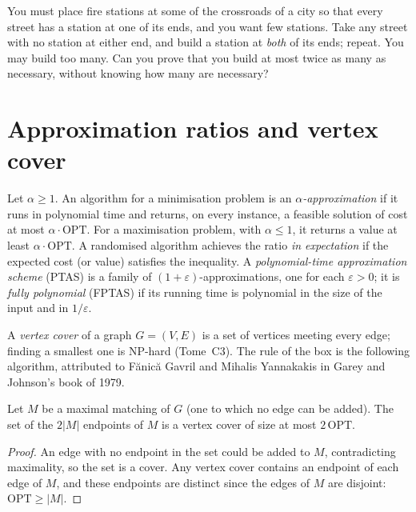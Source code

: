 \begin{think}
You must place fire stations at some of the crossroads of a city so that every street has a station at one of its ends, and you want few stations. Take any street with no station at either end, and build a station at \emph{both} of its ends; repeat. You may build too many. Can you prove that you build at most twice as many as necessary, without knowing how many are necessary?
\end{think}

\section{Approximation ratios and vertex cover}\label{sec:vc}

\begin{definition}
Let $\alpha\ge1$. An algorithm for a minimisation problem is an \emph{$\alpha$-approximation} if it runs in polynomial time and returns, on every instance, a feasible solution of cost at most $\alpha\cdot\mathrm{OPT}$. For a maximisation problem, with $\alpha\le1$, it returns a value at least $\alpha\cdot\mathrm{OPT}$. A randomised algorithm achieves the ratio \emph{in expectation} if the expected cost (or value) satisfies the inequality.
A \emph{polynomial-time approximation scheme} (PTAS) is a family of $(1+\varepsilon)$-approximations, one for each $\varepsilon>0$; it is \emph{fully polynomial} (FPTAS) if its running time is polynomial in the size of the input and in $1/\varepsilon$.
\end{definition}

A \emph{vertex cover} of a graph $G=(V,E)$ is a set of vertices meeting every edge; finding a smallest one is NP-hard (Tome~C3). The rule of the box is the following algorithm, attributed to Fănică Gavril and Mihalis Yannakakis in Garey and Johnson's book of 1979.

\begin{proposition}\label{prop:vcmatching}
Let $M$ be a maximal matching of $G$ (one to which no edge can be added). The set of the $2|M|$ endpoints of $M$ is a vertex cover of size at most $2\,\mathrm{OPT}$.
\end{proposition}
\begin{proof}
An edge with no endpoint in the set could be added to $M$, contradicting maximality, so the set is a cover. Any vertex cover contains an endpoint of each edge of $M$, and these endpoints are distinct since the edges of $M$ are disjoint: $\mathrm{OPT}\ge|M|$.
\end{proof}

